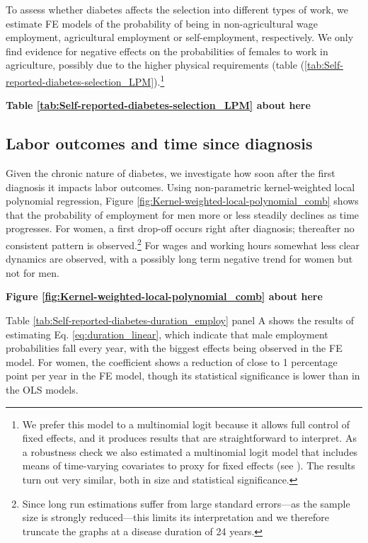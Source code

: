 \documentclass[12pt,english]{article}
\begin{document}
To assess whether diabetes affects the selection into different types of work, we estimate \ac{FE} models of the probability of being in non-agricultural wage employment, agricultural employment or self-employment, respectively. We only find evidence for negative effects on the probabilities of females to work in agriculture, possibly due to the higher physical requirements (table (\ref{tab:Self-reported-diabetes-selection_LPM}).\footnote{We prefer this model to a multinomial logit because it allows full control of fixed effects, and it produces results that are straightforward to interpret. As a robustness check we also estimated a multinomial logit model that includes means of time-varying covariates to proxy for fixed effects (see \textcite{Mundlak1978,Bell2015}). The results turn out very similar, both in size and statistical significance.}

\begin{center}
	\textbf{Table \ref{tab:Self-reported-diabetes-selection_LPM} about here}
\end{center}

\subsection{\label{sec:duration}Labor outcomes and time since diagnosis}

Given the chronic nature of diabetes, we investigate how soon after the first diagnosis it impacts labor outcomes. Using non-parametric kernel-weighted local polynomial regression, Figure \ref{fig:Kernel-weighted-local-polynomial_comb} shows that the probability of employment for men more or less steadily declines as time progresses. For women, a first drop-off occurs right after diagnosis; thereafter no consistent pattern is observed.\footnote{Since long run estimations suffer from large standard errors---as the sample size is strongly reduced---this limits its interpretation and we therefore truncate the graphs at a disease duration of 24 years.} For wages and working hours somewhat less clear dynamics are observed, with a possibly long term negative trend for women but not for men.

\begin{center}
	\textbf{Figure \ref{fig:Kernel-weighted-local-polynomial_comb} about here}
\end{center}


Table \ref{tab:Self-reported-diabetes-duration_employ} panel A shows the results of estimating Eq. \ref{eq:duration_linear}, which indicate that male employment probabilities fall every year, with the biggest effects being observed in the \ac{FE} model. For women, the coefficient shows a reduction of close to 1 percentage point per year in the \ac{FE} model, though its statistical significance is lower than in the \ac{OLS} models. 
\end{document}
